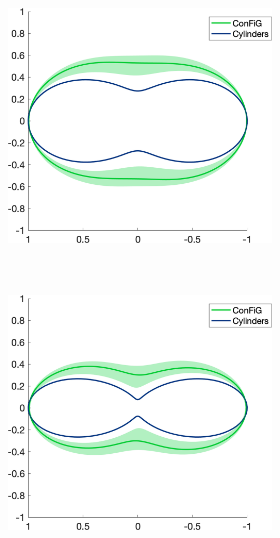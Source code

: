 \begin{figure}
  \begin{subfigure}[]{\textwidth}
  \begin{subfigure}[]{0.3\textwidth}
    \includegraphics[width=\textwidth]{figures/frf_experiment/threeperp_prctiles_b_1000}
  \end{subfigure}
  ~
  \begin{subfigure}[]{0.3\textwidth}
    \includegraphics[width=\textwidth]{figures/frf_experiment/threeperp_prctiles_b_2000}

\end{subfigure}
\end{subfigure}
\end{figure}
